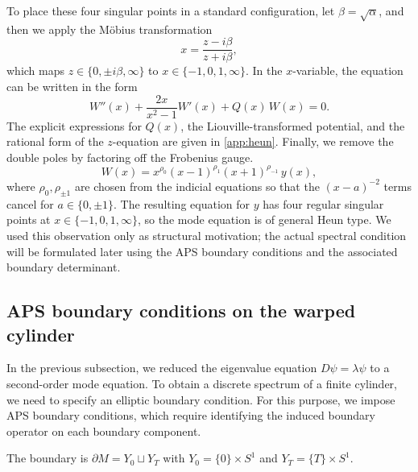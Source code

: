 \documentclass[11pt]{article}
\theoremstyle{definition}
\numberwithin{equation}{section}
\begin{document}
To place these four singular points in a standard configuration, let \(\beta=\sqrt{\alpha}\), and then we apply the M\"obius transformation
\begin{equation}\label{eq:mobius}
x=\frac{z-i\beta}{z+i\beta},
\end{equation}
which maps \(z \in  \{0,\pm i\beta,\infty\}\) to \(x\in\{-1,0,1,\infty\}\). In the \(x\)-variable, the equation can be written in the form
\begin{equation}\label{eq:normalized-x}
W''(x)+\frac{2x}{x^2-1}W'(x)+Q(x)\,W(x)=0.
\end{equation}
The explicit expressions for \(Q(x)\), the Liouville-transformed potential, and the rational form of the \(z\)-equation are given in \autoref{app:heun}.
Finally, we remove the double poles by factoring off the Frobenius gauge.
\begin{equation}\label{eq:frobenius-gauge}
W(x)=x^{\rho_0}(x-1)^{\rho_1}(x+1)^{\rho_{-1}}\,y(x),
\end{equation}
where \(\rho_0,\rho_{\pm1}\) are chosen from the indicial equations so that the \((x-a)^{-2}\) terms cancel for \(a\in\{0,\pm1\}\). The resulting equation for \(y\) has four regular singular points at \(x\in\{-1,0,1,\infty\}\), so the mode equation is of general Heun type. We used this observation only as structural motivation; the actual spectral condition will be formulated later using the APS boundary conditions and the associated boundary determinant.






\subsection{APS boundary conditions on the warped cylinder}\label{subsec:aps}


In the previous subsection, we reduced the eigenvalue equation
$D \psi =  \lambda \psi$ to a second-order mode equation. To obtain a discrete spectrum of a finite cylinder, we need to specify an elliptic boundary condition. For this purpose, we impose APS boundary conditions, which require identifying the induced boundary operator on each boundary component.

The boundary is $\partial M = Y_0 \sqcup Y_T$ with $Y_0 = \{ 0 \} \times S^1$ and $Y_T  = \{ T \} \times S^1$. 
\end{document}
